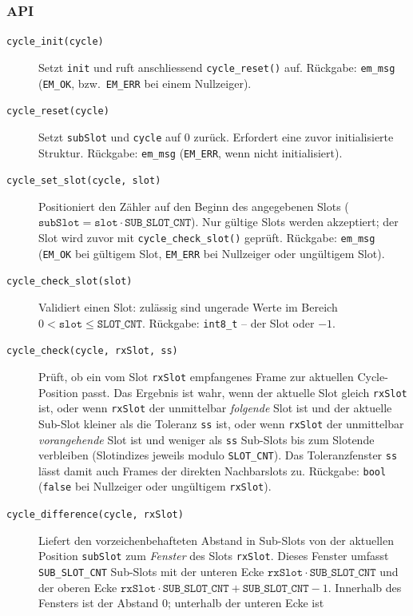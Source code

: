 \subsubsection*{API}
\begin{description}
\item[\texttt{cycle\_init(cycle)}] Setzt \verb|init| und ruft anschliessend
  \verb|cycle_reset()| auf. Rückgabe: \verb|em_msg| (\verb|EM_OK|, bzw.\
  \verb|EM_ERR| bei einem Nullzeiger).
\item[\texttt{cycle\_reset(cycle)}] Setzt \verb|subSlot| und \verb|cycle|
  auf $0$ zurück. Erfordert eine zuvor initialisierte Struktur. Rückgabe:
  \verb|em_msg| (\verb|EM_ERR|, wenn nicht initialisiert).
\item[\texttt{cycle\_set\_slot(cycle, slot)}] Positioniert den Zähler auf den
  Beginn des angegebenen Slots ($\mathtt{subSlot} = \mathtt{slot} \cdot
  \mathtt{SUB\_SLOT\_CNT}$). Nur gültige Slots werden akzeptiert; der Slot wird
  zuvor mit \verb|cycle_check_slot()| geprüft. Rückgabe: \verb|em_msg|
  (\verb|EM_OK| bei gültigem Slot, \verb|EM_ERR| bei Nullzeiger oder
  ungültigem Slot).
\item[\texttt{cycle\_check\_slot(slot)}] Validiert einen Slot: zulässig sind
  ungerade Werte im Bereich $0 < \mathtt{slot} \le \mathtt{SLOT\_CNT}$.
  Rückgabe: \verb|int8_t| -- der Slot oder $-1$.
\item[\texttt{cycle\_check(cycle, rxSlot, ss)}] Prüft, ob ein vom Slot
  \verb|rxSlot| empfangenes Frame zur aktuellen Cycle-Position passt. Das
  Ergebnis ist wahr, wenn der aktuelle Slot gleich \verb|rxSlot| ist, oder
  wenn \verb|rxSlot| der unmittelbar \emph{folgende} Slot ist und der aktuelle
  Sub-Slot kleiner als die Toleranz \verb|ss| ist, oder wenn \verb|rxSlot|
  der unmittelbar \emph{vorangehende} Slot ist und weniger als \verb|ss|
  Sub-Slots bis zum Slotende verbleiben (Slotindizes jeweils modulo
  \verb|SLOT_CNT|). Das Toleranzfenster \verb|ss| lässt damit auch Frames der
  direkten Nachbarslots zu. Rückgabe: \verb|bool| (\verb|false| bei Nullzeiger
  oder ungültigem \verb|rxSlot|).
\item[\texttt{cycle\_difference(cycle, rxSlot)}] Liefert den
  vorzeichenbehafteten Abstand in Sub-Slots von der aktuellen Position \verb|subSlot|
  zum \emph{Fenster} des Slots \verb|rxSlot|. Dieses Fenster umfasst
  \verb|SUB_SLOT_CNT| Sub-Slots mit der unteren Ecke
  $\mathtt{rxSlot} \cdot \mathtt{SUB\_SLOT\_CNT}$ und der oberen Ecke
  $\mathtt{rxSlot} \cdot \mathtt{SUB\_SLOT\_CNT} + \mathtt{SUB\_SLOT\_CNT} - 1$.
  Innerhalb des Fensters ist der Abstand $0$; unterhalb der unteren Ecke ist

\end{description}
